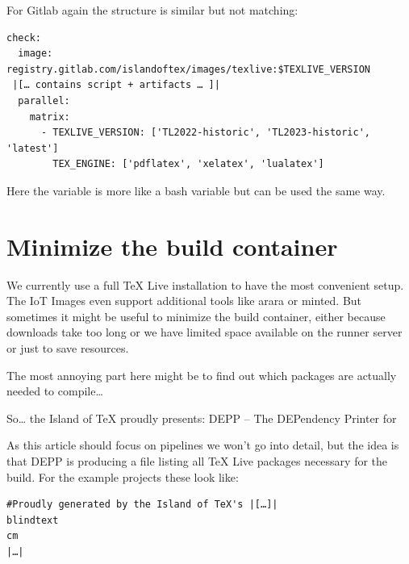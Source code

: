 \documentclass[final]{ltugboat}
\newcommand*{\TeXLive}{\acro{\TeX\,Live}}
\begin{document}

For Gitlab again the structure is similar but not matching:

\begin{verbatim}
check:
  image: registry.gitlab.com/islandoftex/images/texlive:$TEXLIVE_VERSION
 |[… contains script + artifacts … ]|
  parallel:
    matrix:
      - TEXLIVE_VERSION: ['TL2022-historic', 'TL2023-historic', 'latest']
        TEX_ENGINE: ['pdflatex', 'xelatex', 'lualatex']
\end{verbatim}

Here the variable is more like a bash variable but can be used the same way.


\section{Minimize the build container}
We currently use a full TeX Live installation to have the most convenient setup.
The IoT Images even support additional tools like arara or minted.
But sometimes it might be useful to minimize the build container, either because downloads take too long or we have limited space available on the runner server or just to save resources.

The most annoying part here might be to find out which packages are actually needed to compile…

So… the Island of TeX proudly presents: DEPP – The DEPendency Printer for \TeXLive\cite{depp}

As this article should focus on pipelines we won't go into detail, but the idea is that DEPP is producing a file listing all TeX Live packages necessary for the build.
For the example projects these look like:

\begin{verbatim}
#Proudly generated by the Island of TeX's |[…]|
blindtext
cm
|…|
\end{verbatim}
\end{document}
